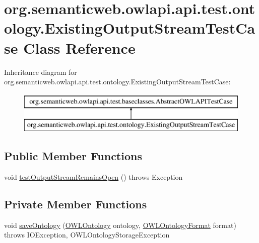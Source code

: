 \hypertarget{classorg_1_1semanticweb_1_1owlapi_1_1api_1_1test_1_1ontology_1_1_existing_output_stream_test_case}{\section{org.\-semanticweb.\-owlapi.\-api.\-test.\-ontology.\-Existing\-Output\-Stream\-Test\-Case Class Reference}
\label{classorg_1_1semanticweb_1_1owlapi_1_1api_1_1test_1_1ontology_1_1_existing_output_stream_test_case}
}
Inheritance diagram for org.\-semanticweb.\-owlapi.\-api.\-test.\-ontology.\-Existing\-Output\-Stream\-Test\-Case\-:\begin{figure}[H]
\begin{center}
\leavevmode
\includegraphics[height=2.000000cm]{classorg_1_1semanticweb_1_1owlapi_1_1api_1_1test_1_1ontology_1_1_existing_output_stream_test_case}
\end{center}
\end{figure}
\subsection*{Public Member Functions}
\begin{DoxyCompactItemize}
\item 
void \hyperlink{classorg_1_1semanticweb_1_1owlapi_1_1api_1_1test_1_1ontology_1_1_existing_output_stream_test_case_a49edcbb9e98ca0a9ce26ce1c9f6cd578}{test\-Output\-Stream\-Remains\-Open} ()  throws Exception 
\end{DoxyCompactItemize}
\subsection*{Private Member Functions}
\begin{DoxyCompactItemize}
\item 
void \hyperlink{classorg_1_1semanticweb_1_1owlapi_1_1api_1_1test_1_1ontology_1_1_existing_output_stream_test_case_ae86e6b735a4601a9101385dc1d2512aa}{save\-Ontology} (\hyperlink{interfaceorg_1_1semanticweb_1_1owlapi_1_1model_1_1_o_w_l_ontology}{O\-W\-L\-Ontology} ontology, \hyperlink{classorg_1_1semanticweb_1_1owlapi_1_1model_1_1_o_w_l_ontology_format}{O\-W\-L\-Ontology\-Format} format)  throws I\-O\-Exception, O\-W\-L\-Ontology\-Storage\-Exception 
\end{DoxyCompactItemize}

